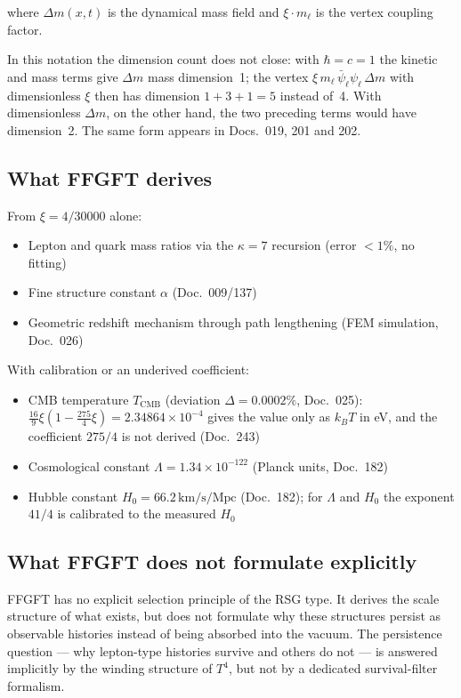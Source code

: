 where $\Delta m(x,t)$ is the dynamical mass field and $\xi \cdot m_\ell$ is
the vertex coupling factor.

In this notation the dimension count does not close: with $\hbar = c = 1$ the kinetic and mass terms give $\Delta m$ mass dimension~1; the vertex $\xi\,m_\ell\,\bar\psi_\ell\psi_\ell\,\Delta m$ with dimensionless $\xi$ then has dimension $1+3+1 = 5$ instead of~4. With dimensionless $\Delta m$, on the other hand, the two preceding terms would have dimension~2. The same form appears in Docs.~019, 201 and 202.

\subsection{What FFGFT derives}

From $\xi = 4/30000$ alone:

\begin{itemize}
  \item Lepton and quark mass ratios via the $\kappa=7$ recursion
        (error $<1\%$, no fitting)
  \item Fine structure constant $\alpha$ (Doc.~009/137)
  \item Geometric redshift mechanism through path lengthening
        (FEM simulation, Doc.~026)
\end{itemize}

With calibration or an underived coefficient:

\begin{itemize}
  \item CMB temperature $T_\text{CMB}$ (deviation $\Delta = 0.0002\%$, Doc.~025):
        $\tfrac{16}{9}\xi(1-\tfrac{275}{4}\xi) = 2.34864\times10^{-4}$ gives the
        value only as $k_BT$ in eV, and the coefficient $275/4$ is not
        derived (Doc.~243)
  \item Cosmological constant $\Lambda = 1.34\times10^{-122}$
        (Planck units, Doc.~182)
  \item Hubble constant $H_0 = 66.2\,\text{km/s/Mpc}$ (Doc.~182);
        for $\Lambda$ and $H_0$ the exponent $41/4$ is calibrated to the
        measured $H_0$
\end{itemize}

\subsection{What FFGFT does not formulate explicitly}

FFGFT has no explicit selection principle of the RSG type. It derives the
scale structure of what exists, but does not formulate why these structures
persist as observable histories instead of being absorbed into the vacuum.
The persistence question — why lepton-type histories survive and others do
not — is answered implicitly by the winding structure of $T^4$, but not by
a dedicated survival-filter formalism.

